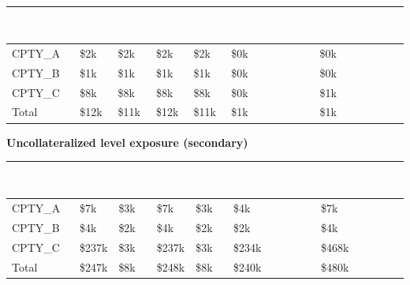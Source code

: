 \documentclass[11pt,letterpaper]{article}
\begin{document}
{\scriptsize\setlength{\LTpre}{4pt}\setlength{\LTpost}{6pt}
\begin{longtable}{>{\raggedright\arraybackslash}p{}>{\raggedright\arraybackslash}p{}>{\raggedright\arraybackslash}p{}>{\raggedright\arraybackslash}p{}>{\raggedright\arraybackslash}p{}>{\raggedright\arraybackslash}p{}>{\raggedright\arraybackslash}p{}}
\toprule
\rowcolor{navy}\textbf{\textcolor{white}{Netting set}} & \textbf{\textcolor{white}{CVA}} & \textbf{\textcolor{white}{DVA}} & \textbf{\textcolor{white}{FCA}} & \textbf{\textcolor{white}{FBA}} & \textbf{\textcolor{white}{FVA = FCA - FBA}} & \textbf{\textcolor{white}{CVA - DVA + FVA}} \\
\endhead
CPTY\_A & \$2k & \$2k & \$2k & \$2k & \$0k & \$0k \\
\rowcolor{gray!9}CPTY\_B & \$1k & \$1k & \$1k & \$1k & \$0k & \$0k \\
CPTY\_C & \$8k & \$8k & \$8k & \$8k & \$0k & \$1k \\
\rowcolor{gray!9}Total & \$12k & \$11k & \$12k & \$11k & \$1k & \$1k \\
\bottomrule
\end{longtable}}

\textbf{Uncollateralized level exposure (secondary)}

{\scriptsize\setlength{\LTpre}{4pt}\setlength{\LTpost}{6pt}
\begin{longtable}{>{\raggedright\arraybackslash}p{}>{\raggedright\arraybackslash}p{}>{\raggedright\arraybackslash}p{}>{\raggedright\arraybackslash}p{}>{\raggedright\arraybackslash}p{}>{\raggedright\arraybackslash}p{}>{\raggedright\arraybackslash}p{}}
\toprule
\rowcolor{navy}\textbf{\textcolor{white}{Netting set}} & \textbf{\textcolor{white}{CVA}} & \textbf{\textcolor{white}{DVA}} & \textbf{\textcolor{white}{FCA}} & \textbf{\textcolor{white}{FBA}} & \textbf{\textcolor{white}{FVA = FCA - FBA}} & \textbf{\textcolor{white}{CVA - DVA + FVA}} \\
\endhead
CPTY\_A & \$7k & \$3k & \$7k & \$3k & \$4k & \$7k \\
\rowcolor{gray!9}CPTY\_B & \$4k & \$2k & \$4k & \$2k & \$2k & \$4k \\
CPTY\_C & \$237k & \$3k & \$237k & \$3k & \$234k & \$468k \\
\rowcolor{gray!9}Total & \$247k & \$8k & \$248k & \$8k & \$240k & \$480k \\
\bottomrule
\end{longtable}}
\end{document}

